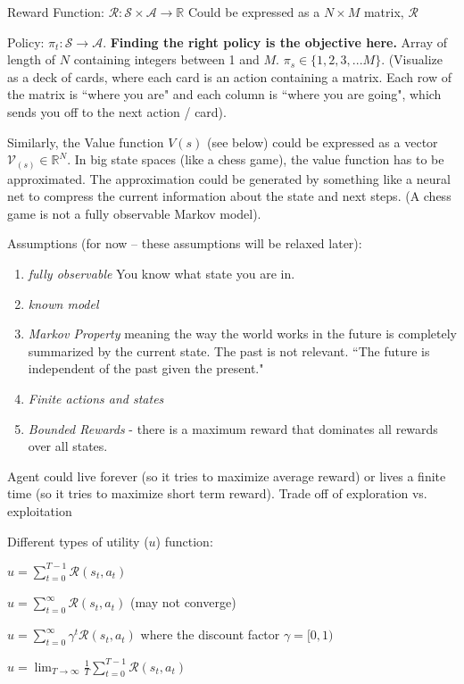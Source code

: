 \documentclass[11pt, oneside]{article}   	%
\begin{document}
Reward Function: $\mathcal{R}: \mathcal{S} \times \mathcal{A} \rightarrow \mathbb{R}$ Could be expressed as a $N \times M$ matrix, $\mathbf{\mathcal{R}}$

Policy: $\pi_t: \mathcal{S} \rightarrow \mathcal{A}$. \textbf{Finding the right policy is the objective here.} Array of length of $N$ containing integers between 1 and $M$. $\pi_s \in \{1,2,3,...M\}$.  (Visualize as a deck of cards, where each card is an action containing a matrix. Each row of the matrix is ``where you are" and each column is ``where you are going", which sends you off to the next action / card).

Similarly, the Value function $V(s)$ (see below) could be expressed as a vector $\mathbf{\mathcal{V}}_{(s)} \in \mathbb{R}^N$. In big state spaces (like a chess game), the value function has to be approximated. The approximation could be generated by something like a neural net to compress the current information about the state and next steps. (A chess game is not a fully observable Markov model).

Assumptions (for now -- these assumptions will be relaxed later):
\begin{enumerate}
	\item \emph{fully observable} You know what state you are in.
	\item \emph{known model}
	\item \emph{Markov Property} meaning the way the world works in the future is completely summarized by the current state. The past is not relevant. ``The future is independent of the past given the present."
	\item \emph{Finite actions and states}
	\item \emph{Bounded Rewards} - there is a maximum reward that dominates all rewards over all states.
\end{enumerate}

Agent could live forever (so it tries to maximize average reward) or lives a finite time (so it tries to maximize short term reward). Trade off of exploration vs. exploitation

Different types of utility ($u$) function:
\begin{description} \itemsep5pt
	\item[Finite Horizon*]	$u = \sum_{t=0}^{T-1}\mathcal{R}(s_t, a_t)$
	\item[Total Reward]$u = \sum_{t=0}^\infty\mathcal{R}(s_t,a_t)$ (may not converge)
	\item[Total Discounted Reward*]$u = \sum_{t=0}^\infty\gamma^t\mathcal{R}(s_t,a_t)$ where the discount factor $\gamma = [0,1)$
	\item[Long-run Average Reward]$u= \lim_{T\rightarrow\infty}\frac{1}{T}\sum_{t=0}^{T-1}\mathcal{R}(s_t,a_t)$
\end{description}
\end{document}
